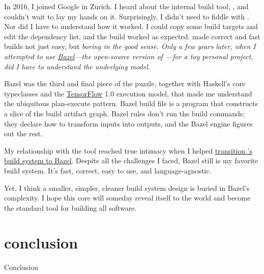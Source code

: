 \documentclass{article}
\begin{document}
In 2016, I joined Google in Zurich.
I heard about the internal build tool, , and couldn't wait to lay my hands on it.
Surprisingly, I didn't need to fiddle with .
Nor did I have to understand how it worked.
I could copy some build targets and edit the dependency list, and the build worked as expected.
 made correct and fast builds not just easy, but \em{boring} in the good sense.
Only a few years later, when I attempted to use \href{https://bazel.build/}{Bazel}---the open-source version of ---for a toy personal project, did I have to understand the underlying model.

Bazel was the third and final piece of the puzzle, together with Haskell's core typeclasses and the \href{https://www.tensorflow.org/}{TensorFlow} 1.0 execution model, that made me understand the ubiquitous plan-execute pattern.
Bazel build file is a program that constructs a slice of the build artifact graph.
Bazel rules don't run the build commands; they declare how to transform inputs into outputs, and the Bazel engine figures out the rest.

My relationship with the tool reached true intimacy when I helped \href{/posts/17-scaling-rust-builds-with-bazel.html}{transition 's build system to Bazel}.
Despite all the challenges I faced, Bazel still is my favorite build system.
It's fast, correct, easy to use, and language-agnostic.

Yet, I think a smaller, simpler, cleaner build system design is buried in Bazel's complexity.
I hope this core will someday reveal itself to the world and become the standard tool for building all software.

\section{conclusion}{Conclusion}
\end{document}
